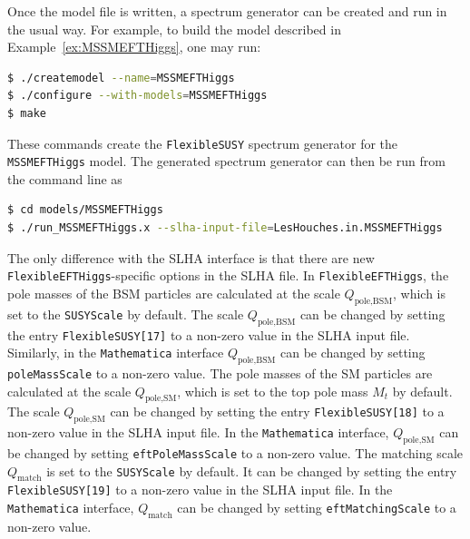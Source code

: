 \documentclass[final,3p,11pt,pdflatex]{elsarticle}
\makeatletter
\newcommand{\modelname}[1]{\texttt{#1}\@\xspace}
\newcommand{\fs}{\texttt{FlexibleSUSY}\@\xspace}
\newcommand{\feft}{\texttt{Flex\-ib\-le\-EFT\-Higgs}\@\xspace}
\newcommand{\mathematica}{\texttt{Ma\-the\-ma\-ti\-ca}\xspace}
\newcommand{\code}[1]{\lstinline|#1|}  %
\newcommand{\Qmatch}{\ensuremath{Q_\text{match}}}
\newcommand{\QpoleBSM}{\ensuremath{Q_\text{pole,BSM}}}
\newcommand{\QpoleSM}{\ensuremath{Q_\text{pole,SM}}}
\newcommand{\exref}[1]{Example~\ref{#1}}
\makeatother
\begin{document}
Once the model file is written, a spectrum generator can be created and
run in the usual way.  For example, to build the model described in
\exref{ex:MSSMEFTHiggs}, one may run:
%
\begin{lstlisting}[language=bash]
$ ./createmodel --name=MSSMEFTHiggs
$ ./configure --with-models=MSSMEFTHiggs
$ make
\end{lstlisting}%
%
These commands create the \fs spectrum generator for the
\modelname{MSSMEFTHiggs} model.  The generated spectrum generator can then
be run from the command line as
%
\begin{lstlisting}[language=bash]
$ cd models/MSSMEFTHiggs
$ ./run_MSSMEFTHiggs.x --slha-input-file=LesHouches.in.MSSMEFTHiggs
\end{lstlisting}%
%

The only difference with the SLHA interface is that there are new
\feft-specific options in the SLHA file. In \feft, the pole masses of
the BSM particles are calculated at the scale $\QpoleBSM$, which is
set to the \code{SUSYScale} by default.  The scale $\QpoleBSM$ can be
changed by setting the entry \code{FlexibleSUSY[17]} to a non-zero
value in the SLHA input file.  Similarly, in the \mathematica interface
$\QpoleBSM$ can be changed by setting \code{poleMassScale} to a
non-zero value.
%
The pole masses of the SM particles are calculated at the scale
$\QpoleSM$, which is set to the top pole mass $M_t$ by default.  The
scale $\QpoleSM$ can be changed by setting the entry
\code{FlexibleSUSY[18]} to a non-zero value in the SLHA input file.
In the \mathematica interface, $\QpoleSM$ can be changed by setting
\code{eftPoleMassScale} to a non-zero value.
%
The matching scale $\Qmatch$ is set to the \code{SUSYScale} by
default.  It can be changed by setting the entry \code{FlexibleSUSY[19]} to a
non-zero value in the SLHA input file.  In the \mathematica interface,
$\Qmatch$ can be changed by setting \code{eftMatchingScale} to a
non-zero value.
\end{document}
